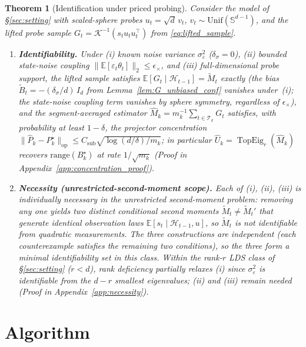 \documentclass{article}
\newcommand{\E}{\mathbb{E}}
\newcommand{\op}{\mathrm{op}}
\newcommand{\cH}{\mathcal{H}}
\newcommand{\cT}{\mathcal{T}}
\newcommand{\range}{\mathrm{range}}
\DeclareMathOperator{\TopEig}{TopEig}
\newtheorem{theorem}{Theorem}[section]
\begin{document}
\begin{theorem}[Identification under priced probing]
\label{thm:identification}
Consider the model of \S\ref{sec:setting} with scaled-sphere probes
$u_t=\sqrt d\,v_t$, $v_t\sim\mathrm{Unif}(\mathbb S^{d-1})$, and the
lifted probe sample $G_t=\mathcal K^{-1}(s_t u_tu_t^\top)$ from
\eqref{eq:lifted_sample}.
\begin{enumerate}[leftmargin=1.5em,itemsep=2pt,topsep=2pt]
\item \textbf{Identifiability.} Under (i) known noise variance
$\sigma_\varepsilon^2$ ($\delta_\sigma=0$), (ii) bounded state-noise
coupling $\|\E[\varepsilon_t\theta_t]\|_2\le\epsilon_\times$, and
(iii) full-dimensional probe support, the lifted sample satisfies
$\E[G_t\mid\cH_{t-1}]=\widetilde M_t$ exactly (the bias $\widetilde B_t=-(\delta_\sigma/d)\,I_d$ from Lemma~\ref{lem:G_unbiased_conf} vanishes under~(i); the state-noise coupling term vanishes by sphere symmetry, regardless of $\epsilon_\times$), and the
segment-averaged estimator
$\widehat M_k=m_k^{-1}\sum_{t\in\cT_k}G_t$ satisfies, with
probability at least $1-\delta$, the projector concentration
$\|\widehat P_k-P_k^\star\|_{\op}\le C_{\mathrm{sub}}\sqrt{\log(d/\delta)/m_k}$;
in particular $\widehat U_k=\TopEig_r(\widehat M_k)$ recovers
$\range(B_k^\star)$ at rate $1/\sqrt{m_k}$ (Proof in Appendix~\ref{app:concentration_proof}).
\item \textbf{Necessity (unrestricted-second-moment scope).} Each of
(i), (ii), (iii) is individually necessary in the unrestricted
second-moment problem: removing any one yields two distinct
conditional second moments $\widetilde M_t\ne\widetilde M_t'$ that
generate identical observation laws
$\E[s_t\mid\cH_{t-1},u]$, so $\widetilde M_t$ is not identifiable from
quadratic measurements. The three constructions are independent (each
counterexample satisfies the remaining two conditions), so the three
form a minimal identifiability set in this class. Within the rank-$r$
LDS class of \S\ref{sec:setting} ($r<d$), rank deficiency partially
relaxes (i) since $\sigma_\varepsilon^2$ is identifiable from the
$d-r$ smallest eigenvalues; (ii) and (iii) remain needed (Proof in Appendix~\ref{app:necessity}).
\end{enumerate}

\end{theorem}

\section{Algorithm}
\label{sec:algorithm}
\end{document}
